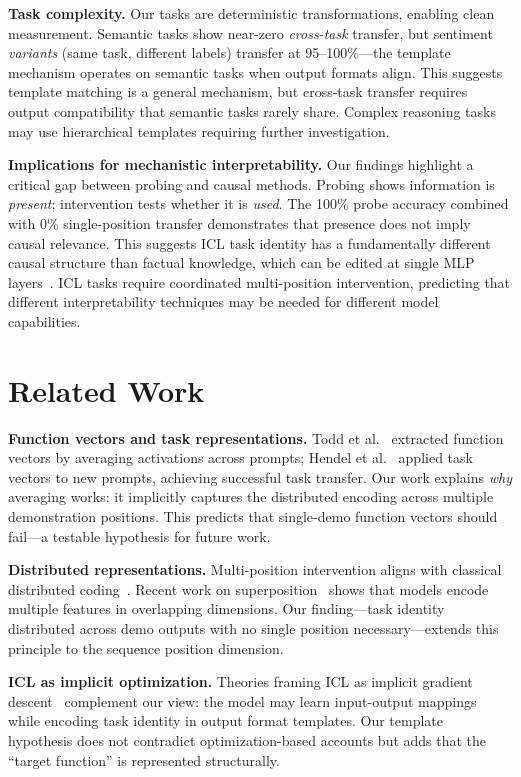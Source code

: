 \documentclass[sigconf,anonymous]{acmart}
\begin{document}
\textbf{Task complexity.}
Our tasks are deterministic transformations, enabling clean measurement. Semantic tasks show near-zero \emph{cross-task} transfer, but sentiment \emph{variants} (same task, different labels) transfer at 95--100\%---the template mechanism operates on semantic tasks when output formats align. This suggests template matching is a general mechanism, but cross-task transfer requires output compatibility that semantic tasks rarely share. Complex reasoning tasks~\cite{wei2022chain} may use hierarchical templates requiring further investigation.

\textbf{Implications for mechanistic interpretability.}
Our findings highlight a critical gap between probing and causal methods. Probing shows information is \emph{present}; intervention tests whether it is \emph{used}. The 100\% probe accuracy combined with 0\% single-position transfer demonstrates that presence does not imply causal relevance. This suggests ICL task identity has a fundamentally different causal structure than factual knowledge, which can be edited at single MLP layers~\cite{meng2022locating}. ICL tasks require coordinated multi-position intervention, predicting that different interpretability techniques may be needed for different model capabilities.

\section{Related Work}
\label{sec:related}

\textbf{Function vectors and task representations.}
Todd et al.~\cite{todd2023function} extracted function vectors by averaging activations across prompts; Hendel et al.~\cite{hendel2023context} applied task vectors to new prompts, achieving successful task transfer. Our work explains \emph{why} averaging works: it implicitly captures the distributed encoding across multiple demonstration positions. This predicts that single-demo function vectors should fail---a testable hypothesis for future work.

\textbf{Distributed representations.}
Multi-position intervention aligns with classical distributed coding~\cite{hinton1986distributed}. Recent work on superposition~\cite{elhage2022superposition} shows that models encode multiple features in overlapping dimensions. Our finding---task identity distributed across demo outputs with no single position necessary---extends this principle to the sequence position dimension.

\textbf{ICL as implicit optimization.}
Theories framing ICL as implicit gradient descent~\cite{dai2022can,vonoswald2023transformers,akyurek2023what} complement our view: the model may learn input-output mappings while encoding task identity in output format templates. Our template hypothesis does not contradict optimization-based accounts but adds that the ``target function'' is represented structurally.
\end{document}
